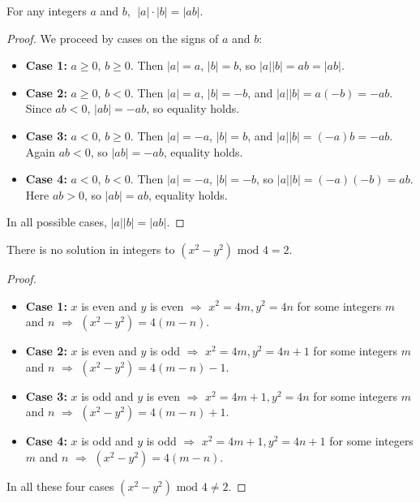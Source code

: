 \begin{theorem}
For any integers $a$ and $b$, $\;|a|\cdot |b| = |ab|$.
\end{theorem}

\begin{proof}
We proceed by cases on the signs of $a$ and $b$:

\begin{itemize}
    \item \textbf{Case 1:} $a \ge 0$, $b \ge 0$. Then $|a|=a$, $|b|=b$, so 
    $|a||b|=ab=|ab|$.
    \item \textbf{Case 2:} $a \ge 0$, $b < 0$. Then $|a|=a$, $|b|=-b$, and 
    $|a||b| = a(-b)=-ab$. Since $ab < 0$, $|ab|=-ab$, so equality holds.
    \item \textbf{Case 3:} $a < 0$, $b \ge 0$. Then $|a|=-a$, $|b|=b$, and 
    $|a||b|=(-a)b=-ab$. Again $ab<0$, so $|ab|=-ab$, equality holds.
    \item \textbf{Case 4:} $a < 0$, $b < 0$. Then $|a|=-a$, $|b|=-b$, so 
    $|a||b|=(-a)(-b)=ab$. Here $ab>0$, so $|ab|=ab$, equality holds.
\end{itemize}

In all possible cases, $|a||b|=|ab|$. 
\end{proof}

\begin{theorem}
There is no solution in integers to $(x^2 - y^2) \mbox{ mod } 4 = 2$.
\end{theorem}
\begin{proof}
\begin{itemize}
\item \textbf{Case 1:} $x$ is even and $y$ is even $\Rightarrow$ $x^2 = 4m, y^2=4n$ for some integers $m$ and $n$ $\Rightarrow$ $(x^2 - y^2) = 4(m-n)$.
\item \textbf{Case 2:} $x$ is even and $y$ is odd $\Rightarrow$ $x^2 = 4m, y^2=4n+1$ for some integers $m$ and $n$ $\Rightarrow$ $(x^2 - y^2) = 4(m-n) - 1$.
\item \textbf{Case 3:} $x$ is odd and $y$ is even $\Rightarrow$ $x^2 = 4m+1, y^2=4n$ for some integers $m$ and $n$ $\Rightarrow$ $(x^2 - y^2) = 4(m-n) + 1$.
\item \textbf{Case 4:} $x$ is odd and $y$ is odd $\Rightarrow$ $x^2 = 4m+1, y^2=4n+1$ for some integers $m$ and $n$ $\Rightarrow$ $(x^2 - y^2) = 4(m-n)$.
\end{itemize}
In all these four cases $(x^2 - y^2) \mbox{ mod } 4 \neq 2$.
\end{proof}

